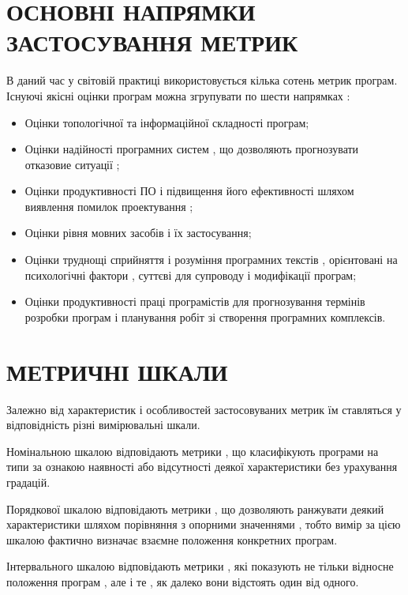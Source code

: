 \section{ОСНОВНІ НАПРЯМКИ ЗАСТОСУВАННЯ МЕТРИК}
\label{2section:id4}
В даний час у світовій практиці використовується кілька сотень метрик програм. Існуючі якісні оцінки програм можна згрупувати по шести напрямках :
\begin{itemize}
\item {} 
Оцінки топологічної та інформаційної складності програм;

\item {} 
Оцінки надійності програмних систем , що дозволяють прогнозувати отказовие ситуації ;

\item {} 
Оцінки продуктивності ПО і підвищення його ефективності шляхом виявлення помилок проектування ;

\item {} 
Оцінки рівня мовних засобів і їх застосування;

\item {} 
Оцінки труднощі сприйняття і розуміння програмних текстів , орієнтовані на психологічні фактори , суттєві для супроводу і модифікації програм;

\item {} 
Оцінки продуктивності праці програмістів для прогнозування термінів розробки програм і планування робіт зі створення програмних комплексів.

\end{itemize}


\section{МЕТРИЧНІ ШКАЛИ}
\label{2section:id5}
Залежно від характеристик і особливостей застосовуваних метрик їм ставляться у відповідність різні вимірювальні шкали.

Номінальною шкалою відповідають метрики , що класифікують програми на типи за ознакою наявності або відсутності деякої характеристики без урахування градацій.

Порядкової шкалою відповідають метрики , що дозволяють ранжувати деякий характеристики шляхом порівняння з опорними значеннями , тобто вимір за цією шкалою фактично визначає взаємне положення конкретних програм.

Інтервального шкалою відповідають метрики , які показують не тільки відносне положення програм , але і те , як далеко вони відстоять один від одного.

